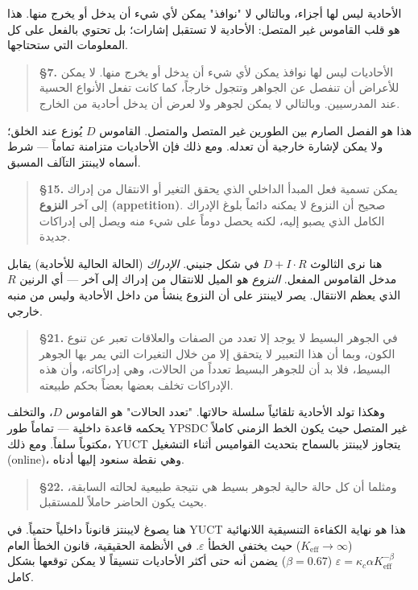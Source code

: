 \documentclass[12pt,a4paper]{article}
\begin{document}
	الأحادية ليس لها أجزاء، وبالتالي لا "نوافذ" يمكن لأي شيء أن يدخل أو يخرج منها. هذا هو قلب القاموس غير المتصل: الأحادية لا تستقبل إشارات؛ بل تحتوي بالفعل على كل المعلومات التي ستحتاجها.
	
	\begin{quote}
		\textbf{§7.} الأحاديات ليس لها نوافذ يمكن لأي شيء أن يدخل أو يخرج منها. لا يمكن للأعراض أن تنفصل عن الجواهر وتتجول خارجاً، كما كانت تفعل الأنواع الحسية عند المدرسيين. وبالتالي لا يمكن لجوهر ولا لعرض أن يدخل أحادية من الخارج.
	\end{quote}
	
	هذا هو الفصل الصارم بين الطورين غير المتصل والمتصل. القاموس \(D\) يُوزع عند الخلق؛ ولا يمكن لإشارة خارجية أن تعدله. ومع ذلك فإن الأحاديات متزامنة تماماً — شرط أسماه لايبنتز التآلف المسبق.
	
	\begin{quote}
		\textbf{§15.} يمكن تسمية فعل المبدأ الداخلي الذي يحقق التغير أو الانتقال من إدراك إلى آخر \textbf{النزوع (appetition)}. صحيح أن النزوع لا يمكنه دائماً بلوغ الإدراك الكامل الذي يصبو إليه، لكنه يحصل دوماً على شيء منه ويصل إلى إدراكات جديدة.
	\end{quote}
	
	هنا نرى الثالوث \(D+I\cdot R\) في شكل جنيني. \emph{الإدراك} (الحالة الحالية للأحادية) يقابل مدخل القاموس المفعل. \emph{النزوع} هو الميل للانتقال من إدراك إلى آخر — أي الرنين \(R\) الذي يعظم الانتقال. يصر لايبنتز على أن النزوع ينشأ من داخل الأحادية وليس من منبه خارجي.
	
	\begin{quote}
		\textbf{§21.} في الجوهر البسيط لا يوجد إلا تعدد من الصفات والعلاقات تعبر عن تنوع الكون، وبما أن هذا التعبير لا يتحقق إلا من خلال التغيرات التي يمر بها الجوهر البسيط، فلا بد أن للجوهر البسيط تعدداً من الحالات، وهي إدراكاته، وأن هذه الإدراكات تخلف بعضها بعضاً بحكم طبيعته.
	\end{quote}
	
	وهكذا تولد الأحادية تلقائياً سلسلة حالاتها. "تعدد الحالات" هو القاموس \(D\)، والتخلف يحكمه قاعدة داخلية — تماماً طور YPSDC غير المتصل حيث يكون الخط الزمني كاملاً مكتوباً سلفاً. ومع ذلك، YUCT يتجاوز لايبنتز بالسماح بتحديث القواميس أثناء التشغيل (online)، وهي نقطة سنعود إليها أدناه.
	
	\begin{quote}
		\textbf{§22.} ومثلما أن كل حالة حالية لجوهر بسيط هي نتيجة طبيعية لحالته السابقة، بحيث يكون الحاضر حاملاً للمستقبل.
	\end{quote}
	
	هنا يصوغ لايبنتز قانوناً داخلياً حتمياً. في YUCT هذا هو نهاية الكفاءة التنسيقية اللانهائية (\(K_{\mathrm{eff}} \to \infty\)) حيث يختفي الخطأ \(\varepsilon\). في الأنظمة الحقيقية، قانون الخطأ العام \(\varepsilon = \kappa_c \alpha K_{\mathrm{eff}}^{-\beta}\) (\(\beta=0.67\)) يضمن أنه حتى أكثر الأحاديات تنسيقاً لا يمكن توقعها بشكل كامل.
	
\end{document}
